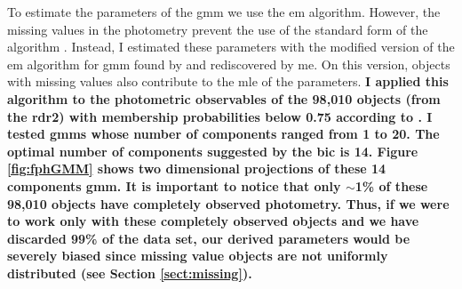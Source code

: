 To estimate the parameters of the \gls{gmm} we use the \gls{em} algorithm. However, the missing values in the photometry prevent the use of the standard form of the algorithm \cite[see for example Chapter 9 of][]{Bishop2006}.
Instead, I estimated these parameters with the modified version of the \gls{em} algorithm for \gls{gmm} found by \citet{McMichael1996} and rediscovered by me. On this version, objects with missing values also contribute to the \gls{mle} of the parameters. \textbf{I applied this algorithm to the photometric observables of the 98,010 objects (from the \gls{rdr2}) with membership probabilities below 0.75 according to \citet{Bouy2015}. I tested \glspl{gmm} whose number of components ranged from 1 to 20. The optimal number of components suggested by the \gls{bic} is 14. Figure \ref{fig:fphGMM} shows two dimensional projections of these 14 components \gls{gmm}. It is important to notice that only $\sim$1\% of these 98,010 objects have completely observed  photometry. Thus, if we were to work only with these completely observed objects and we have discarded 99\% of the data set, our derived parameters would be severely biased since missing value objects are not uniformly distributed (see Section \ref{sect:missing}).}

